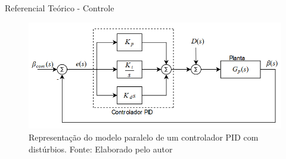 \documentclass{beamer}
\begin{document}
\begin{frame}{Referencial Teórico - Controle}
    \begin{figure}[HT]
		\begin{center}
		\captionsetup{justification=centering}
        \includegraphics[scale=.45]{../referencial/img/pid_controller_Snider_p35}
        \caption{Representação do modelo paralelo de um controlador PID com distúrbios. \newline
        		 Fonte: Elaborado pelo autor}
		\label{FIG_ADAPTATIVO}
        \end{center}
	\end{figure}
\end{frame}

\end{document}
